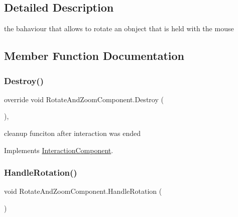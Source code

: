 \subsection{Detailed Description}
the bahaviour that allows to rotate an obnject that is held with the mouse 



\subsection{Member Function Documentation}
\mbox{\label{class_rotate_and_zoom_component_aa116a1acdc75d587605b6fa043474982}} 
\subsubsection{\texorpdfstring{Destroy()}{Destroy()}}
{\footnotesize\ttfamily override void Rotate\+And\+Zoom\+Component.\+Destroy (\begin{DoxyParamCaption}{ }\end{DoxyParamCaption})\hspace{0.3cm}{\ttfamily [protected]}, {\ttfamily [virtual]}}



cleanup funciton after interaction was ended 



Implements \mbox{\hyperlink{class_interaction_component_aa28f5c9f92b342c3d52f8b0b251fb4fa}{Interaction\+Component}}.

\mbox{\label{class_rotate_and_zoom_component_a4f44c8f8dc5f9b2f1f38075595d20489}} 
\subsubsection{\texorpdfstring{Handle\+Rotation()}{HandleRotation()}}
{\footnotesize\ttfamily void Rotate\+And\+Zoom\+Component.\+Handle\+Rotation (\begin{DoxyParamCaption}{ }\end{DoxyParamCaption})\hspace{0.3cm}{\ttfamily [private]}}



